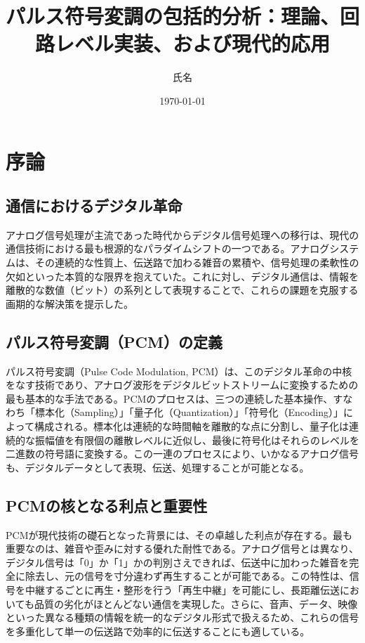 \documentclass[
  a4paper,  %
  11pt,     %
]{ltjsarticle}%
\title{パルス符号変調の包括的分析：理論、回路レベル実装、および現代的応用}
\author{氏名}
\date{\today}
\begin{document}
\maketitle
\tableofcontents
\clearpage

\section{序論}

\subsection{通信におけるデジタル革命}

アナログ信号処理が主流であった時代からデジタル信号処理への移行は、現代の通信技術における最も根源的なパラダイムシフトの一つである。アナログシステムは、その連続的な性質上、伝送路で加わる雑音の累積や、信号処理の柔軟性の欠如といった本質的な限界を抱えていた。これに対し、デジタル通信は、情報を離散的な数値（ビット）の系列として表現することで、これらの課題を克服する画期的な解決策を提示した。

\subsection{パルス符号変調（PCM）の定義}

パルス符号変調（Pulse Code Modulation, PCM）は、このデジタル革命の中核をなす技術であり、アナログ波形をデジタルビットストリームに変換するための最も基本的な手法である\cite{ref1}。PCMのプロセスは、三つの連続した基本操作、すなわち「標本化（Sampling）」「量子化（Quantization）」「符号化（Encoding）」によって構成される\cite{ref1}。標本化は連続的な時間軸を離散的な点に分割し、量子化は連続的な振幅値を有限個の離散レベルに近似し、最後に符号化はそれらのレベルを二進数の符号語に変換する。この一連のプロセスにより、いかなるアナログ信号も、デジタルデータとして表現、伝送、処理することが可能となる。

\subsection{PCMの核となる利点と重要性}

PCMが現代技術の礎石となった背景には、その卓越した利点が存在する。最も重要なのは、雑音や歪みに対する優れた耐性である\cite{ref1}。アナログ信号とは異なり、デジタル信号は「0」か「1」かの判別さえできれば、伝送中に加わった雑音を完全に除去し、元の信号を寸分違わず再生することが可能である。この特性は、信号を中継するごとに再生・整形を行う「再生中継」を可能にし、長距離伝送においても品質の劣化がほとんどない通信を実現した\cite{ref1}。さらに、音声、データ、映像といった異なる種類の情報を統一的なデジタル形式で扱えるため、これらの信号を多重化して単一の伝送路で効率的に伝送することにも適している\cite{ref1}。
\end{document}
